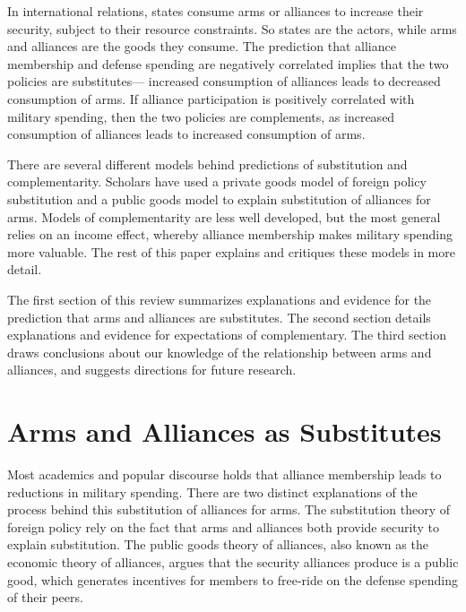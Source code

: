 \documentclass[12pt]{article}
\begin{document}
In international relations, states consume arms or alliances to increase their security, subject to their resource constraints. 
So states are the actors, while arms and alliances are the goods they consume. 
The prediction that alliance membership and defense spending are negatively correlated implies that the two policies are substitutes--- increased consumption of alliances leads to decreased consumption of arms. 
If alliance participation is positively correlated with military spending, then the two policies are complements, as increased consumption of alliances leads to increased consumption of arms. 


There are several different models behind predictions of substitution and complementarity. 
Scholars have used a private goods model of foreign policy substitution and a public goods model to explain substitution of alliances for arms. 
Models of complementarity are less well developed, but the most general relies on an income effect, whereby alliance membership makes military spending more valuable. 
The rest of this paper explains and critiques these models in more detail. 


The first section of this review summarizes explanations and evidence for the prediction that arms and alliances are substitutes. 
The second section details explanations and evidence for expectations of complementary. 
The third section draws conclusions about our knowledge of the relationship between arms and alliances, and suggests directions for future research. 





\section{Arms and Alliances as Substitutes}

Most academics and popular discourse holds that alliance membership leads to reductions in military spending. 
There are two distinct explanations of the process behind this substitution of alliances for arms. 
The substitution theory of foreign policy rely on the fact that arms and alliances both provide security to explain substitution. 
The public goods theory of alliances, also known as the economic theory of alliances, argues that the security alliances produce is a public good, which generates incentives for members to free-ride on the defense spending of their peers. 
\end{document}
